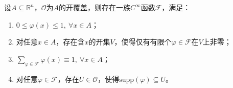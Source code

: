 \documentclass[../../main.tex]{subfiles}%
\begin{document}
\begin{theorem}
设$A\subseteq\mathbb{R}^{n}$，$\mathscr{O}$为$A$的开覆盖，则存在一族$C^{\infty}$函数$\mathscr{F}$，满足：
\begin{enumerate}[(1)]
\item $0\leqslant\varphi(x)\leqslant 1,\ \forall x\in A$；
\item 对任意$x\in A$，存在含$x$的开集$V$，使得仅有有限个$\varphi\in\mathscr{F}$在$V$上非零；
\item $\sum\limits_{\varphi\in\mathscr{F}}\varphi(x)\equiv 1,\ \forall x\in A$；
\item 对任意$\varphi\in\mathscr{F}$，存在$U\in\mathscr{O}$，使得$\mathrm{supp}(\varphi)\subseteq U$。
\end{enumerate}
\end{theorem}
\end{document}
